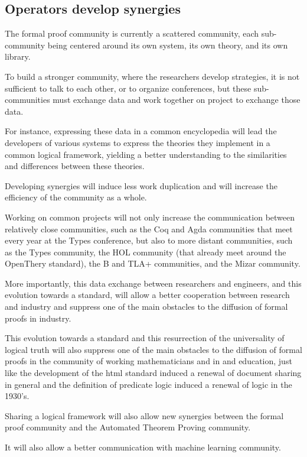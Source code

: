 \subsection{Operators develop synergies}

The formal proof community is currently a scattered community, each
sub-community being centered around its own system, its own theory,
and its own library.

To build a stronger community, where the researchers develop strategies,
it is not sufficient to talk to each other, or to organize conferences,
but these sub-communities must exchange data and work together on project to
exchange those data.

For instance, expressing these data in a common encyclopedia will
lead the developers of various systems to express the theories they
implement in a common logical framework, yielding a better understanding
to the similarities and differences between these theories.

Developing synergies will induce less work duplication and will increase
the efficiency of the community as a whole.

Working on common projects will not only increase the communication
between relatively close communities, such as the {\sf Coq} and {\sf
  Agda} communities that meet every year at the Types conference, but
also to more distant communities, such as the Types community, the HOL
community (that already meet around the OpenThery standard), the B and
TLA+ communities, and the Mizar community.

More importantly, this data exchange between researchers and
engineers, and this evolution towards a standard, will allow a better
cooperation between research and industry and suppress one of the main
obstacles to the diffusion of formal proofs in industry.

This evolution towards a standard and this resurrection of the
universality of logical truth will also suppress one of the main
obstacles to the diffusion of formal proofs in the community of
working mathematicians and in and education, just like the development
of the html standard induced a renewal of document sharing in general
and the definition of predicate logic induced a renewal of logic in
the 1930's.

Sharing a logical framework will also allow new synergies between 
the formal proof community and the Automated Theorem Proving community.

It will also allow a better communication with machine learning community.

